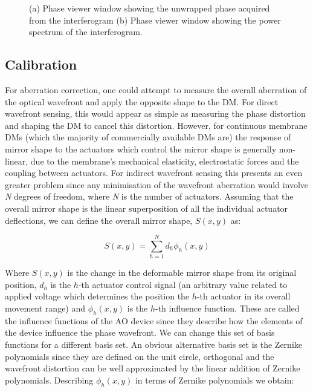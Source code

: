 \begin{figure}[h]
\begin{subfigure}{0.45\textwidth}
		\caption{}
		\label{fig:phase_viewer_ft}
	\end{subfigure}
	\caption{(a) Phase viewer window showing the unwrapped phase acquired from the interferogram (b) Phase viewer window showing the power spectrum of the interferogram. }
	\label{fig:phase_viewer}
\end{figure}

\subsection{Calibration}
\label{subsec:calibration}

For aberration correction, one could attempt to measure the overall aberration of the optical wavefront and apply the opposite shape to the DM. For direct wavefront sensing, this would appear as simple as measuring the phase distortion and shaping the DM to cancel this distortion. However, for continuous membrane DMs (which the majority of commercially available DMs are) the response of mirror shape to the actuators which control the mirror shape is generally non-linear, due to the membrane's mechanical elasticity, electrostatic forces and the coupling between actuators.\cite{Zhu:99} For indirect wavefront sensing this presents an even greater problem since any minimisation of the wavefront aberration would involve \textit{N} degrees of freedom, where \textit{N} is the number of actuators. Assuming that the overall mirror shape is the linear 
superposition of all the individual actuator deflections, we can 
define the overall mirror shape, $S(x,y)$ as:

\begin{equation}\label{eq:surface_shape}
S(x,y) = \sum_{h=1}^{N} d_{h}\phi_{h}(x,y)
\end{equation}

Where $S(x,y)$ is the change in the deformable mirror shape from its original position, $d_h$ is the $h$-th actuator control signal (an arbitrary value related to applied voltage which determines the position the $h$-th actuator in its overall movement range) and $\phi_{h}(x,y)$ is the $h$-th influence function. These are called the influence functions of the AO device since they describe how the elements of the device influence the phase wavefront. We can change this set of basis functions for a different basis set. An obvious alternative basis set is the Zernike polynomials since they are defined on the unit circle, orthogonal and the wavefront distortion can be well approximated by the linear addition of Zernike polynomials\cite{von1934beugungstheorie,noll1976zernike,mahajan1994zernike}. Describing $\phi_{h}(x,y)$ in terms of Zernike polynomials we obtain:


